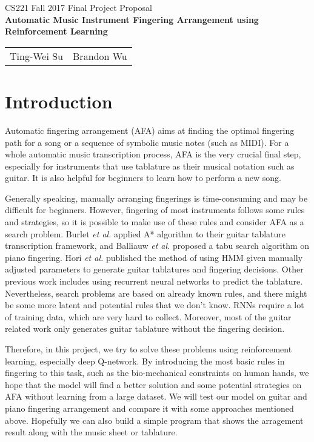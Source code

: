\documentclass[12pt]{article}
\begin{document}
\begin{center}
{\Large CS221 Fall 2017 Final Project Proposal\\}
{\Large \textbf{Automatic Music Instrument Fingering Arrangement using Reinforcement Learning}}

\begin{tabular}{ll}
Ting-Wei Su & Brandon Wu \\
\end{tabular}
\end{center}

\section*{Introduction}

Automatic fingering arrangement (AFA) aims at finding the optimal fingering path for a song or a sequence of symbolic music notes (such as MIDI). 
For a whole automatic music transcription process, AFA is the very crucial final step, especially for instruments that use tablature as their musical notation such as guitar. It is also helpful for beginners to learn how to perform a new song. 

Generally speaking, manually arranging fingerings is time-consuming and may be difficult for beginners. 
However, fingering of most instruments follows some rules and strategies, so it is possible to make use of these rules and consider AFA as a search problem. Burlet \textit{et al.}\cite{burlet2013robotaba} applied A* algorithm to their guitar tablature transcription framework, and Balliauw \textit{et al.}\cite{balliauw2015generating} proposed a tabu search algorithm on piano fingering. Hori \textit{et al.}\cite{hori2013input} published the method of using HMM given manually adjusted parameters to generate guitar tablatures and fingering decisions.
Other previous work includes using recurrent neural networks to predict the tablature\cite{mistler2017thesis}. 
Nevertheless, search problems are based on already known rules, and there might be some more latent and potential rules that we don't know. RNNs require a lot of training data, which are very hard to collect. Moreover, most of the guitar related work only generates guitar tablature without the fingering decision.

Therefore, in this project, we try to solve these problems using reinforcement learning, especially deep Q-network. By introducing the most basic rules in fingering to this task, such as the bio-mechanical constraints on human hands, we hope that the model will find a better solution and some potential strategies on AFA without learning from a large dataset. We will test our model on guitar and piano fingering arrangement and compare it with some approaches mentioned above. Hopefully we can also build a simple program that shows the arragement result along with the music sheet or tablature.
\end{document}
